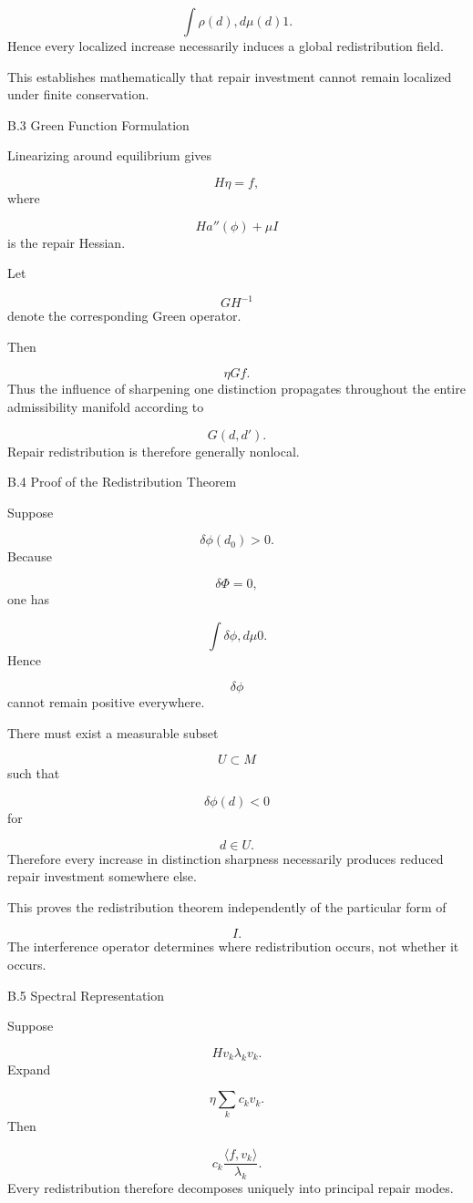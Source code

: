 \documentclass[12pt,oneside]{article}
\theoremstyle{plain}
\theoremstyle{definition}
\theoremstyle{remark}
\begin{document}
\[
\int
\rho(d)
,d\mu(d)
1. 
\]
Hence every localized increase necessarily induces a global redistribution field.

This establishes mathematically that repair investment cannot remain localized under finite conservation.


B.3 Green Function Formulation

Linearizing around equilibrium gives

\[
H\eta=f,
\]
where

\[
H
a''(\phi)
+
\mu I
\]
is the repair Hessian.

Let

\[
G
H^{-1}
\]
denote the corresponding Green operator.

Then

\[
\eta
Gf.
\]
Thus the influence of sharpening one distinction propagates throughout the entire admissibility manifold according to

\[
G(d,d').
\]
Repair redistribution is therefore generally nonlocal.


B.4 Proof of the Redistribution Theorem

Suppose

\[
\delta\phi(d_0)>0.
\]
Because

\[
\delta\Phi=0,
\]
one has

\[
\int
\delta\phi
,d\mu
0. 
\]
Hence

\[
\delta\phi
\]
cannot remain positive everywhere.

There must exist a measurable subset

\[
U
\subset
M
\]
such that

\[
\delta\phi(d)<0
\]
for

\[
d\in U.
\]
Therefore every increase in distinction sharpness necessarily produces reduced repair investment somewhere else.

This proves the redistribution theorem independently of the particular form of

\[
I.
\]
The interference operator determines where redistribution occurs, not whether it occurs.


B.5 Spectral Representation

Suppose

\[
H
v_k
\lambda_k
v_k.
\]
Expand

\[
\eta
\sum_k
c_kv_k.
\]
Then

\[
c_k
\frac{\langle f,v_k\rangle}
{\lambda_k}.
\]
Every redistribution therefore decomposes uniquely into principal repair modes.
\end{document}
